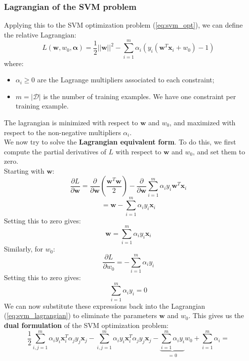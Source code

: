 \subsubsection{Lagrangian of the SVM problem}
Applying this to the SVM optimization problem (\ref{eq:svm_opt}), we can define the relative Lagrangian:
\begin{equation} \label{eq:svm_lagrangian}
    L(\boldsymbol{w}, w_0, \boldsymbol{\alpha}) = \frac{1}{2} ||\boldsymbol{w}||^2 - \sum_{i = 1}^m \alpha_i (y_i (\boldsymbol{w}^T \boldsymbol{x}_i + w_0) - 1)
\end{equation}
where:
\begin{itemize}
    \item $\alpha_i \geq 0$ are the Lagrange multipliers associated to each constraint;
    \item $m = |\mathcal{D}|$ is the number of training examples. We have one constraint per training example.
\end{itemize}
The lagrangian is minimized with respect to $\boldsymbol{w}$ and $w_0$, and maximized with respect to the non-negative multipliers $\alpha_i$.
\\We now try to solve the \textbf{Lagrangian equivalent form}. To do this, we first compute the partial derivatives of $L$ 
with respect to $\boldsymbol{w}$ and $w_0$, and set them to zero.
\\Starting with $\boldsymbol{w}$:
\[ \frac{\partial L}{\partial \boldsymbol{w}} = \frac{\partial}{\partial \boldsymbol{w}} \left( \frac{\boldsymbol{w}^T \boldsymbol{w}}{2} \right)-   \frac{\partial}{\partial \boldsymbol{w}} \sum_{i = 1}^m \alpha_i y_i \boldsymbol{w}^T \boldsymbol{x}_i \]
\[ = \boldsymbol{w} - \sum_{i = 1}^m \alpha_i y_i \boldsymbol{x}_i \]
Setting this to zero gives:
\begin{equation}
    \boldsymbol{w} = \sum_{i = 1}^m \alpha_i y_i \boldsymbol{x}_i
\end{equation}
Similarly, for $w_0$:
\[ \frac{\partial L}{\partial w_0} = - \sum_{i = 1}^m \alpha_i y_i \]
Setting this to zero gives:
\begin{equation}
    \sum_{i = 1}^m \alpha_i y_i = 0
\end{equation}
We can now substitute these expressions back into the Lagrangian (\ref{eq:svm_lagrangian}) to eliminate the parameters $\boldsymbol{w}$ and $w_0$.
This gives us the \textbf{dual formulation} of the SVM optimization problem:
\[
\frac{1}{2} \sum_{i,j=1}^{m} \alpha_i y_i \mathbf{x}_i^{T} \alpha_j y_j \mathbf{x}_j
- \sum_{i,j=1}^{m} \alpha_i y_i \mathbf{x}_i^{T} \alpha_j y_j \mathbf{x}_j
- \underbrace{\sum_{i=1}^{m} \alpha_i y_i}_{\text{ = 0}} w_0
+ \sum_{i=1}^{m} \alpha_i =
\]
